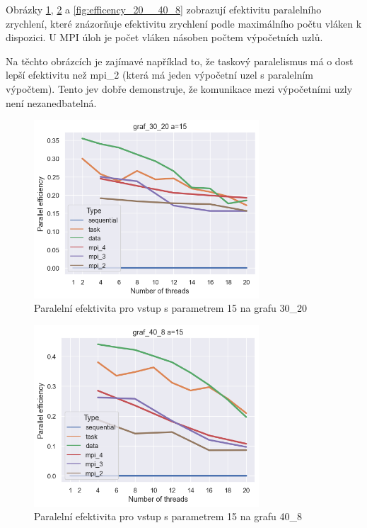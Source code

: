 \documentclass[epsf,epic,eepic,eepicemu]{article}\oddsidemargin=-5mm
\begin{document}
Obrázky \ref{fig:efficency_15__30_20}, \ref{fig:efficency_15__40_8} a \ref{fig:efficency_20__40_8} zobrazují efektivitu paralelního zrychlení, které znázorňuje efektivitu zrychlení podle maximálního počtu vláken k dispozici. U MPI úloh je počet vláken násoben počtem výpočetních uzlů.

Na těchto obrázcích je zajímavé například to, že taskový paralelismus má o dost lepší efektivitu než mpi\_2 (která má jeden výpočetní uzel s paralelním výpočtem). Tento jev dobře demonstruje, že komunikace mezi výpočetními uzly není nezanedbatelná.

\begin{figure}
\centering
\includegraphics[width=0.75\textwidth]{images/efficency_15__30_20}
\caption{Paralelní efektivita pro vstup s parametrem 15 na grafu 30\_20}
\label{fig:efficency_15__30_20}
\end{figure}
\begin{figure}
\centering
\includegraphics[width=0.75\textwidth]{images/efficency_15__40_8}
\caption{Paralelní efektivita pro vstup s parametrem 15 na grafu 40\_8}
\label{fig:efficency_15__40_8}
\end{figure}
\end{document}
